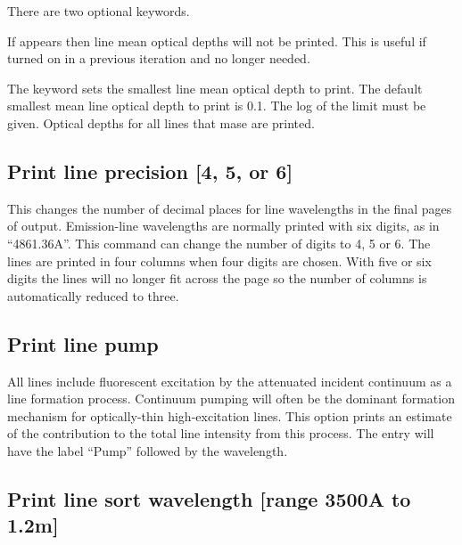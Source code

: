There are two optional
keywords.

If  appears then line mean optical depths will not be printed.  This is
useful if turned on in a previous iteration and no longer needed.

The keyword  sets the smallest line mean optical depth to print.
The
default smallest mean line optical depth to print is 0.1.
The log of the limit
must be given.
Optical depths for all lines that mase are printed.

\subsection{Print line precision [4, 5, or 6]}

This changes the number of decimal places for line wavelengths in the final pages of
output.
Emission-line wavelengths are normally printed with six digits,
as in ``4861.36A''.
This command can change the number of digits to 4, 5 or 6.
The lines are printed in four columns when four digits are chosen.
With five or six digits the lines will no longer fit across the page so
the number of columns is automatically reduced to three.


\subsection{Print line pump}

All lines include fluorescent excitation by the attenuated incident
continuum as a line formation process.
Continuum pumping will often be
the dominant formation mechanism for optically-thin high-excitation lines.
This option prints an estimate of the contribution to the total line
intensity from this process.
The entry will have the label ``Pump'' followed by the wavelength.

\subsection{Print line sort wavelength [range 3500A to 1.2m]}

